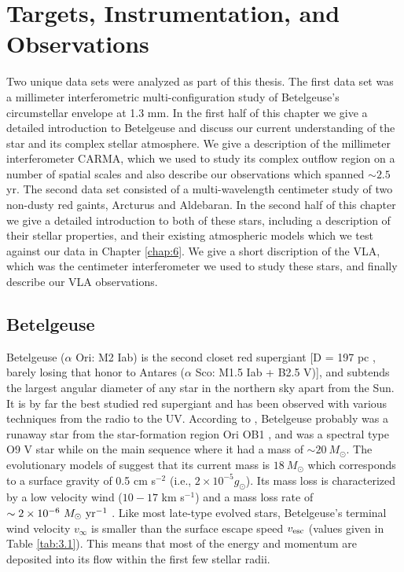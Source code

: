 
\chapter{Targets, Instrumentation, and Observations} \label{chap:3}

Two unique data sets were analyzed as part of this thesis. The first data set was a millimeter interferometric multi-configuration study of Betelgeuse's circumstellar envelope at 1.3 mm. In the first half of this chapter we give a detailed introduction to Betelgeuse and discuss our current understanding of the star and its complex stellar atmosphere. We give a description of the millimeter interferometer CARMA, which we used to study its complex outflow region on a number of spatial scales and also describe our observations which spanned $\sim 2.5$ yr. The second data set consisted of a multi-wavelength centimeter study of two non-dusty red gaints, Arcturus and Aldebaran. In the second half of this chapter we give a detailed introduction to both of these stars, including a description of their stellar properties, and their existing atmospheric models which we test against our data in Chapter \ref{chap:6}. We give a short discription of the VLA, which was the centimeter interferometer we used to study these stars, and finally describe our VLA observations.

\section{Betelgeuse}\label{sec:3.1}
Betelgeuse ($\alpha$ Ori: M2 Iab) is the second closet red supergiant [D = 197 pc \citep{harper_2008}, barely losing that honor to Antares ($\alpha$ Sco: M1.5 Iab + B2.5 V)], and subtends the largest angular diameter of any star in the northern sky apart from the Sun. It is by far the best studied red supergiant and has been observed with various techniques from the radio to the UV. According to \cite{harper_2001}, Betelgeuse probably was a runaway star from the star-formation region Ori OB1 \cite[see, e.g.,][]{hoogerwerf_2000}, and was a spectral type O9 V star while on the main sequence where it had a mass of $\sim 20 \ M_{\odot}$. The evolutionary models of \cite{meynet_2003} suggest that its current mass is $18 \ M_{\odot}$ which corresponds to a surface gravity of 0.5 cm s$^{-2}$  (i.e., $2\times 10^{-5}g_{\odot}$). Its mass loss is characterized by a low velocity wind ($10-17$ km s$^{-1}$) and a mass loss rate of $\sim 2\times 10^{-6} \ M_{\odot} \ \rm{yr}^{-1}$ \citep{harper_2001}. Like most late-type evolved stars, Betelgeuse's  terminal wind velocity $v_{\infty}$ is smaller than the surface escape speed $v_{\rm{esc}}$ (values given in Table \ref{tab:3.1}). This means that most of the energy and momentum are deposited into its flow within the first few stellar radii.

